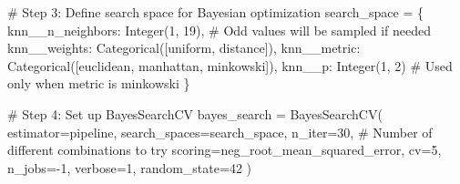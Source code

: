 \documentclass[
  letterpaper,
  DIV=11,
  numbers=noendperiod]{scrreprt}
\newenvironment{Shaded}{\begin{snugshade}}{\end{snugshade}}
\newcommand{\CommentTok}[1]{\textcolor[rgb]{0.37,0.37,0.37}{#1}}
\newcommand{\DecValTok}[1]{\textcolor[rgb]{0.68,0.00,0.00}{#1}}
\newcommand{\NormalTok}[1]{\textcolor[rgb]{0.00,0.23,0.31}{#1}}
\newcommand{\OperatorTok}[1]{\textcolor[rgb]{0.37,0.37,0.37}{#1}}
\newcommand{\StringTok}[1]{\textcolor[rgb]{0.13,0.47,0.30}{#1}}
\begin{document}
\begin{Shaded}
\begin{Highlighting}[]
\CommentTok{\# Step 3: Define search space for Bayesian optimization}
\NormalTok{search\_space }\OperatorTok{=}\NormalTok{ \{}
    \StringTok{\textquotesingle{}knn\_\_n\_neighbors\textquotesingle{}}\NormalTok{: Integer(}\DecValTok{1}\NormalTok{, }\DecValTok{19}\NormalTok{),  }\CommentTok{\# Odd values will be sampled if needed}
    \StringTok{\textquotesingle{}knn\_\_weights\textquotesingle{}}\NormalTok{: Categorical([}\StringTok{\textquotesingle{}uniform\textquotesingle{}}\NormalTok{, }\StringTok{\textquotesingle{}distance\textquotesingle{}}\NormalTok{]),}
    \StringTok{\textquotesingle{}knn\_\_metric\textquotesingle{}}\NormalTok{: Categorical([}\StringTok{\textquotesingle{}euclidean\textquotesingle{}}\NormalTok{, }\StringTok{\textquotesingle{}manhattan\textquotesingle{}}\NormalTok{, }\StringTok{\textquotesingle{}minkowski\textquotesingle{}}\NormalTok{]),}
    \StringTok{\textquotesingle{}knn\_\_p\textquotesingle{}}\NormalTok{: Integer(}\DecValTok{1}\NormalTok{, }\DecValTok{2}\NormalTok{)  }\CommentTok{\# Used only when metric is minkowski}
\NormalTok{\}}
\end{Highlighting}
\end{Shaded}

\begin{Shaded}
\begin{Highlighting}[]
\CommentTok{\# Step 4: Set up BayesSearchCV}
\NormalTok{bayes\_search }\OperatorTok{=}\NormalTok{ BayesSearchCV(}
\NormalTok{    estimator}\OperatorTok{=}\NormalTok{pipeline,}
\NormalTok{    search\_spaces}\OperatorTok{=}\NormalTok{search\_space,}
\NormalTok{    n\_iter}\OperatorTok{=}\DecValTok{30}\NormalTok{,  }\CommentTok{\# Number of different combinations to try}
\NormalTok{    scoring}\OperatorTok{=}\StringTok{\textquotesingle{}neg\_root\_mean\_squared\_error\textquotesingle{}}\NormalTok{,}
\NormalTok{    cv}\OperatorTok{=}\DecValTok{5}\NormalTok{,}
\NormalTok{    n\_jobs}\OperatorTok{={-}}\DecValTok{1}\NormalTok{,}
\NormalTok{    verbose}\OperatorTok{=}\DecValTok{1}\NormalTok{,}
\NormalTok{    random\_state}\OperatorTok{=}\DecValTok{42}
\NormalTok{)}
\end{Highlighting}
\end{Shaded}
\end{document}
